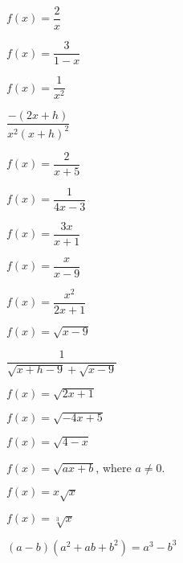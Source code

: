 \documentclass{ximera}
\begin{document}
\begin{question}
\begin{problem}
$f(x) = \dfrac{2}{x}$
\end{problem} 

\begin{problem}
$f(x) = \dfrac{3}{1-x}$
\end{problem}

\begin{problem}
$f(x) = \dfrac{1}{x^2}$

\begin{solution}
$\dfrac{-(2x+h)}{x^2(x+h)^2}$
\end{solution}
\end{problem}  

\begin{problem}
 $f(x) = \dfrac{2}{x+5}$
\end{problem}

\begin{problem}
$f(x) = \dfrac{1}{4x-3}$ 
\end{problem} 

\begin{problem}
$f(x) = \dfrac{3x}{x+1}$  
\end{problem}  

\begin{problem}
$f(x) = \dfrac{x}{x - 9}$  
\end{problem}

\begin{problem}
$f(x) = \dfrac{x^2}{2x+1}$  
\end{problem} 

\begin{problem}
$f(x) = \sqrt{x-9}$

\begin{solution}
$\dfrac{1}{\sqrt{x+h-9} + \sqrt{x-9}}$
\end{solution}
\end{problem}   

\begin{problem}
$f(x) = \sqrt{2x+1}$ 
\end{problem}   

\begin{problem}
$f(x) = \sqrt{-4x+5}$ 
\end{problem}

\begin{problem}
$f(x) = \sqrt{4-x}$ 
\end{problem}

\begin{problem}
$f(x) = \sqrt{ax+b}$, where $a \neq 0$.
\end{problem}

\begin{problem}
$f(x) = x \sqrt{x}$
\end{problem}

\begin{problem}\label{diffquotexerlast}
$f(x) = \sqrt[3]{x}$

\begin{hint}
$(a-b)\left(a^2+ab+b^2\right) = a^3 - b^3$
\end{hint}
\end{problem}
  

\end{question}
\end{document}
